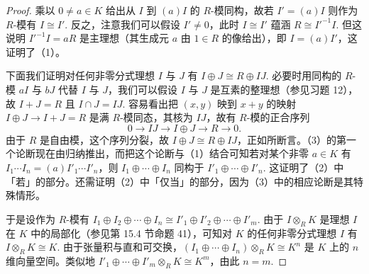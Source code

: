 \begin{proof}
乘以 \(0 \neq a \in K\) 给出从 \(I\) 到 \((a)I\) 的 \(R\)-模同构，故若 \(I' = (a)I\) 则作为 \(R\)-模有 \(I \cong I'\). 反之，注意我们可以假设 \(I' \neq 0\)，此时 \(I \cong I'\) 蕴涵 \(R \cong I'^{-1}I\). 但这说明 \(I'^{-1}I = aR\) 是主理想（其生成元 \(a\) 由 \(1 \in R\) 的像给出），即 \(I = (a)I'\)，这证明了（1）。

下面我们证明对任何非零分式理想 \(I\) 与 \(J\) 有 \(I \oplus J \cong R \oplus IJ\). 必要时用同构的 \(R\)-模 \(aI\) 与 \(bJ\) 代替 \(I\) 与 \(J\)，我们可以假设 \(I\) 与 \(J\) 是互素的整理想（参见习题 12），故 \(I+J = R\) 且 \(I \cap J = IJ\). 容易看出把 \((x,y)\) 映到 \(x+y\) 的映射 \(I \oplus J \to I+J = R\) 是满 \(R\)-模同态，其核为 \(IJ\)，故有 \(R\)-模的正合序列
\[
0 \to IJ \to I \oplus J \to R \to 0.
\]
由于 \(R\) 是自由模，这个序列分裂，故 \(I \oplus J \cong R \oplus IJ\)，正如所断言。（3）的第一个论断现在由归纳推出，而把这个论断与（1）结合可知若对某个非零 \(a \in K\) 有 \(I_1\cdots I_n = (a)I'_1\cdots I'_n\)，则 \(I_1 \oplus \cdots \oplus I_n\) 同构于 \(I'_1 \oplus \cdots \oplus I'_n\). 这证明了（2）中「若」的部分。还需证明（2）中「仅当」的部分，因为（3）中的相应论断是其特殊情形。

于是设作为 \(R\)-模有 \(I_1 \oplus I_2 \oplus \cdots \oplus I_n \cong I'_1 \oplus I'_2 \oplus \cdots \oplus I'_m\). 由于 \(I \otimes_RK\) 是理想 \(I\) 在 \(K\) 中的局部化（参见第 15.4 节命题 41），可知对 \(K\) 的任何非零分式理想 \(I\) 有 \(I \otimes_RK \cong K\). 由于张量积与直和可交换，\((I_1 \oplus \cdots \oplus I_n)\otimes_RK \cong K^n\) 是 \(K\) 上的 \(n\) 维向量空间。类似地 \(I'_1 \oplus \cdots \oplus I'_m \otimes_RK \cong K^m\)，由此 \(n = m\).


\end{proof}
